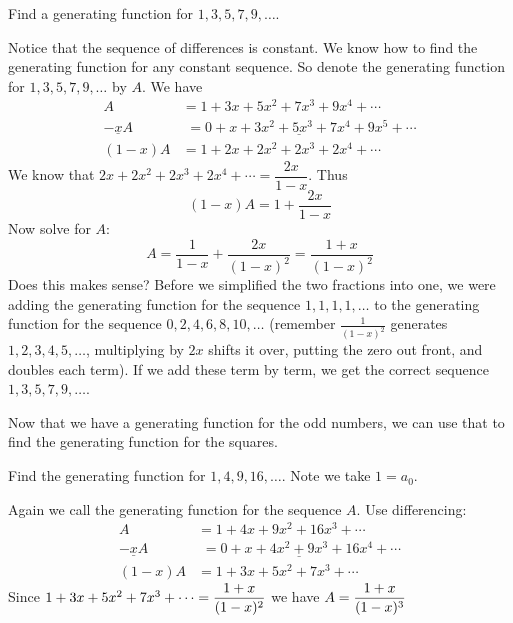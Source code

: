 \documentclass[12pt]{article}
\begin{document}
\begin{example}
 Find a generating function for $1, 3, 5, 7, 9,\ldots$.
 \begin{solution}
  Notice that the sequence of differences is constant. We know how to find the generating function for any constant sequence.  So denote the generating function for $1, 3, 5, 7, 9, \ldots$ by $A$.  We have
  \begin{align*}
   A & = 1 + 3x + 5x^2 + 7x^3 + 9x^4 + \cdots \\
   \underline{-xA} & \underline{\,\,= 0 + x + 3x^2 +  5x^3 + 7x^4 + 9x^5 + \cdots} \\
   (1-x)A & = 1 + 2x + 2x^2 + 2x^3 + 2x^4 + \cdots
  \end{align*}
  We know that $2x + 2x^2 + 2x^3 + 2x^4 + \cdots = \dfrac{2x}{1-x}$.  Thus
  \[(1-x)A = 1 + \frac{2x}{1-x}\]
  Now solve for $A$:
  \[A = \frac{1}{1-x} + \frac{2x}{(1-x)^2} = \frac{1+x}{(1-x)^2}\]
  Does this makes sense?  Before we simplified the two fractions into one, we were adding the generating function for the sequence $1,1,1,1,\ldots$ to the generating function for the sequence $0, 2, 4, 6, 8, 10, \ldots$ (remember $\frac{1}{(1-x)^2}$ generates $1,2,3,4,5, \ldots$, multiplying by $2x$ shifts it over, putting the zero out front, and doubles each term).  If we add these term by term, we get the correct sequence $1,3,5,7, 9, \ldots$.
 \end{solution}

\end{example}


Now that we have a generating function for the odd numbers, we can use that to find the generating function for the squares.

\begin{example}
 Find the generating function for $1, 4, 9, 16, \ldots$.  Note we take $1 = a_0$.
 \begin{solution}
  Again we call the generating function for the sequence $A$.  Use differencing:
  \begin{align*}
   A & = 1 + 4x + 9x^2 + 16x^3 + \cdots \\
   \underline{- xA} & \underline{\,\, = 0 + x + 4x^2 + 9x^3 + 16x^4 + \cdots} \\
   (1-x)A & = 1 + 3x + 5x^2 + 7x^3 + \cdots
  \end{align*}
Since $1 + 3x + 5x^2 + 7x^3 + \cdots = \displaystyle\frac{1+x}{(1-x)^2}$ we have $A = \displaystyle\frac{1+x}{(1-x)^3}$
 \end{solution}
\end{example}
\end{document}
